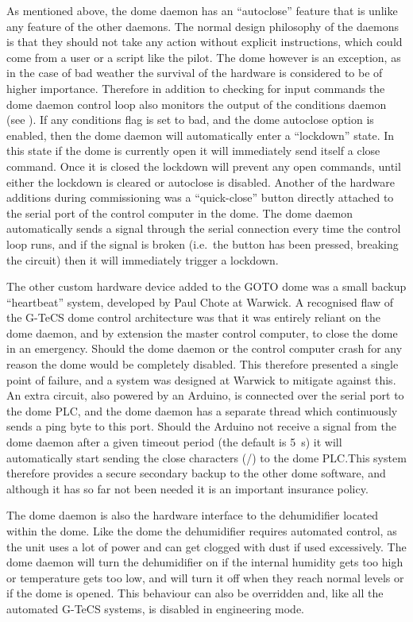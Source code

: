 \begin{colsection}
\begin{colsection}
As mentioned above, the dome daemon has an ``autoclose'' feature that is unlike any feature of the other daemons. The normal design philosophy of the daemons is that they should not take any action without explicit instructions, which could come from a user or a script like the pilot. The dome however is an exception, as in the case of bad weather the survival of the hardware is considered to be of higher importance. Therefore in addition to checking for input commands the dome daemon control loop also monitors the output of the conditions daemon (see ). If any conditions flag is set to bad, and the dome autoclose option is enabled, then the dome daemon will automatically enter a ``lockdown'' state. In this state if the dome is currently open it will immediately send itself a close command. Once it is closed the lockdown will prevent any open commands, until either the lockdown is cleared or autoclose is disabled. Another of the hardware additions during commissioning was a ``quick-close'' button directly attached to the serial port of the control computer in the dome. The dome daemon automatically sends a signal through the serial connection every time the control loop runs, and if the signal is broken (i.e.\ the button has been pressed, breaking the circuit) then it will immediately trigger a lockdown.

The other custom hardware device added to the GOTO dome was a small backup ``heartbeat'' system, developed by Paul Chote at Warwick. A recognised flaw of the G-TeCS dome control architecture was that it was entirely reliant on the dome daemon, and by extension the master control computer, to close the dome in an emergency. Should the dome daemon or the control computer crash for any reason the dome would be completely disabled. This therefore presented a single point of failure, and a system was designed at Warwick to mitigate against this. An extra circuit, also powered by an Arduino, is connected over the serial port to the dome PLC, and the dome daemon has a separate thread which continuously sends a ping byte to this port. Should the Arduino not receive a signal from the dome daemon after a given timeout period (the default is \SI{5}{\second}) it will automatically start sending the close characters (/) to the dome PLC.\@ This system therefore provides a secure secondary backup to the other dome software, and although it has so far not been needed it is an important insurance policy.

The dome daemon is also the hardware interface to the dehumidifier located within the dome. Like the dome the dehumidifier requires automated control, as the unit uses a lot of power and can get clogged with dust if used excessively. The dome daemon will turn the dehumidifier on if the internal humidity gets too high or temperature gets too low, and will turn it off when they reach normal levels or if the dome is opened. This behaviour can also be overridden and, like all the automated G-TeCS systems, is disabled in engineering mode.


\end{colsection}
\end{colsection}
